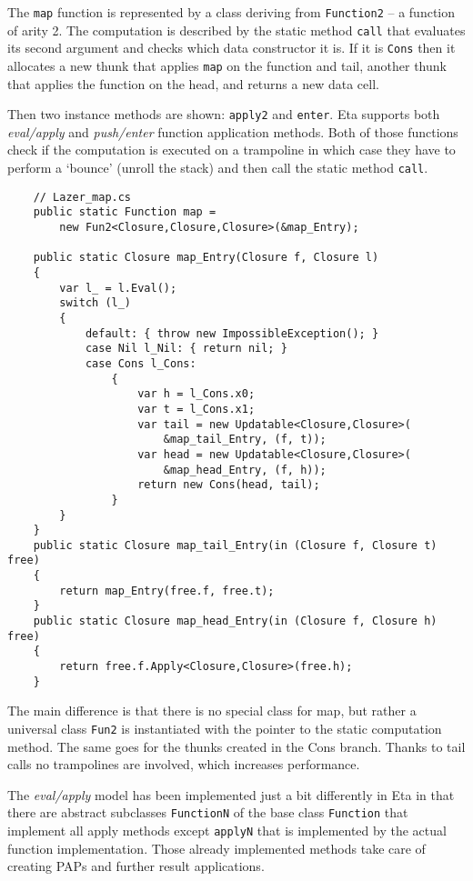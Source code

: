 \documentclass[en]{pracamgr}
\begin{document}
The \texttt{map} function is represented by a class deriving
from \texttt{Function2} -- a function of arity 2.
The computation is described by the static method \texttt{call}
that evaluates its second argument and checks which data
constructor it is. If it is \texttt{Cons} then it
allocates a new thunk that applies \texttt{map} on the function and tail, another thunk that applies the
function on the head, and returns a new data cell.

Then two instance methods are shown: \texttt{apply2} and \texttt{enter}.
Eta supports both \textit{eval/apply} and \textit{push/enter}
function application methods.
Both of those functions check if the computation is
executed on a trampoline in which case they have to
perform a `bounce' (unroll the stack)
and then call the static method \texttt{call}.

\begin{verbatim}
    // Lazer_map.cs
    public static Function map = 
        new Fun2<Closure,Closure,Closure>(&map_Entry);

    public static Closure map_Entry(Closure f, Closure l)
    {
        var l_ = l.Eval();
        switch (l_)
        {
            default: { throw new ImpossibleException(); }
            case Nil l_Nil: { return nil; }
            case Cons l_Cons:
                {
                    var h = l_Cons.x0;
                    var t = l_Cons.x1;
                    var tail = new Updatable<Closure,Closure>(
                        &map_tail_Entry, (f, t));
                    var head = new Updatable<Closure,Closure>(
                        &map_head_Entry, (f, h));
                    return new Cons(head, tail);
                }
        }
    }
    public static Closure map_tail_Entry(in (Closure f, Closure t) free)
    {
        return map_Entry(free.f, free.t);
    }
    public static Closure map_head_Entry(in (Closure f, Closure h) free)
    {
        return free.f.Apply<Closure,Closure>(free.h);
    }
\end{verbatim}

The main difference is that there is no special class for map,
but rather a universal class \texttt{Fun2} is instantiated
with the pointer to the static computation method.
The same goes for the thunks created in the Cons branch.
Thanks to tail calls no trampolines are involved, which
increases performance.

The \textit{eval/apply} model has been implemented just a bit differently
in Eta in that there are abstract subclasses \texttt{FunctionN}
of the base class \texttt{Function} that implement all
apply methods except \texttt{applyN} that is implemented
by the actual function implementation.
Those already implemented methods take care of creating
PAPs and further result applications.
\end{document}

